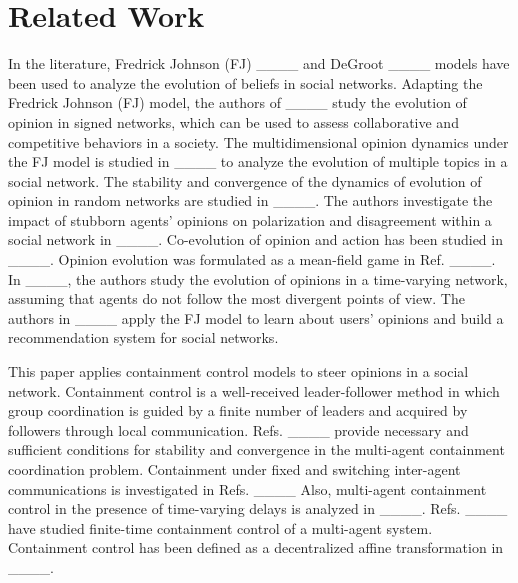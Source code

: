 \section{Related Work}
In the literature, Fredrick Johnson (FJ) ____ and DeGroot ____ models have been used to analyze the evolution of beliefs in social networks. Adapting the Fredrick Johnson (FJ) model, the authors of ____ study the evolution of opinion in signed networks, which can be used to assess collaborative and competitive behaviors in a society. The multidimensional opinion dynamics under the FJ model is studied in ____ to analyze the evolution of multiple topics in a social network. The stability and convergence of the dynamics of evolution of opinion in random networks are studied in ____. The authors investigate the impact of stubborn agents' opinions on polarization and disagreement within a social network in ____. Co-evolution of opinion and action has been studied in ____. Opinion evolution was formulated as a mean-field game in Ref. ____. In ____, the authors study the evolution of opinions in a time-varying network, assuming that agents do not follow the most divergent points of view. The authors in ____ apply the FJ model to learn about users' opinions and build a recommendation system for social networks.  

This paper applies containment control models to steer opinions in a social network. Containment control is  a well-received  leader-follower method in which group coordination is guided by a finite number of leaders and acquired by followers through local communication. Refs. ____ provide necessary and sufficient conditions for stability and convergence in the multi-agent containment coordination problem. Containment under fixed and switching inter-agent communications is investigated in Refs. ____ Also,  multi-agent containment control in the presence of time-varying delays is analyzed in ____. Refs. ____  have studied finite-time containment control of a multi-agent system. Containment control has been defined as a decentralized affine transformation in ____.